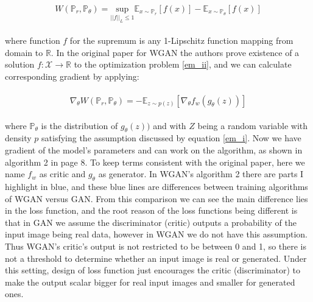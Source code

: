 \documentclass[10pt,twocolumn,letterpaper]{article}
\begin{document}
\begin{equation} 
\begin{split}
\begin{aligned}
W(\mathbb{P}_r, \mathbb{P}_\theta) = \underset{||f||_L \le 1}{\text{sup}} \mathbb{E}_{x \sim\mathbb{P}_r}[f(x)] -  \mathbb{E}_{x \sim\mathbb{P}_\theta}[f(x)]
\end{aligned}
\end{split}
\label{em_ii}
\end{equation}

where function $f$ for the supremum is any 1-Lipschitz function mapping from domain to $\mathbb{R}$. In the original paper for WGAN the authors prove existence of a solution $f: \mathcal{X} \xrightarrow{} \mathbb{R}$ to the optimization problem \ref{em_ii}, and we can calculate corresponding gradient by applying:

\begin{equation} 
\begin{split}
\begin{aligned}
\nabla_{\theta} W(\mathbb{P}_r, \mathbb{P}_\theta) = - \mathbb{E}_{z \sim p(z)}[\nabla_{\theta}f_w(g_\theta(z))] 
\end{aligned}
\end{split}
\label{em_gradient}
\end{equation}

where $\mathbb{P}_\theta$ is the distribution of $g_\theta(z))$ and with $Z$ being a random variable with density $p$ satisfying the assumption discussed by equation \ref{em_i}. Now we have gradient of the model's parameters and can work on the algorithm, as shown in algorithm 2 in page 8. To keep terms consistent with the original paper, here we name $f_w$ as critic and $g_\theta$ as generator. In WGAN's algorithm 2 there are parts I highlight in blue, and these blue lines are differences between training algorithms of WGAN versus GAN. From this comparison we can see the main difference lies in the loss function, and the root reason of the loss functions being different is that in GAN we assume the discriminator (critic) outputs a probability of the input image being real data, however in WGAN we do not have this assumption. Thus WGAN's critic's output is not restricted to be between 0 and 1, so there is not a threshold to determine whether an input image is real or generated. Under this setting, design of loss function just encourages the critic (discriminator) to make the output scalar bigger for real input images and smaller for generated ones.
\end{document}
